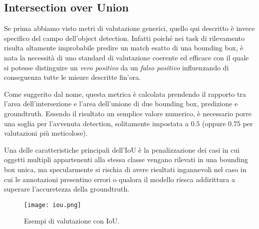 \subsection{Intersection over Union}
Se prima abbiamo visto metri di valutazione generici, quello qui descritto è invece specifico del campo dell'object detection.
Infatti poiché nei task di rilevamento risulta altamente improbabile predire un match esatto di una bounding box, è nata la necessità di uno standard di valutazione coerente ed efficace con il quale si potesse distinguire un \textit{vero positivo} da un \textit{falso positivo} influenzando di conseguenza tutte le misure descritte fin'ora.\par
Come suggerito dal nome, questa metrica è calcolata prendendo il rapporto tra l'area dell'intersezione e l'area dell'unione di due bounding box, predizione e groundtruth. Essendo il risultato un semplice valore numerico, è necessario porre una soglia per l'avvenuta detection, solitamente impostata a $0.5$ (oppure $0.75$ per valutazioni più meticolose).\par
Una delle caratteristiche principali dell'IoU è la penalizzazione dei casi in cui oggetti multipli appartenenti alla stessa classe vengano rilevati in una bounding box unica, ma specularmente si rischia di avere risultati ingannevoli nel caso in cui le annotazioni presentino errori o qualora il modello riesca addirittura a superare l'accuretezza della groundtruth.\par

\begin{figure}[H]
	\centering
	\texttt{[image: iou.png]}
	\caption{Esempi di valutazione con IoU.}
\end{figure}

